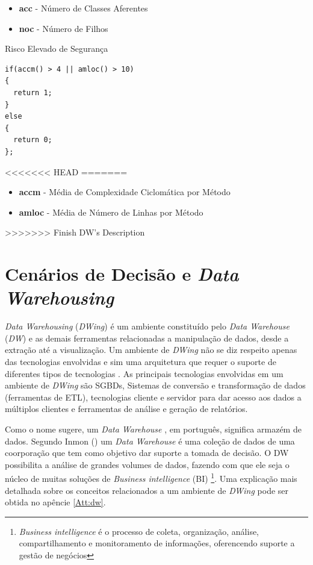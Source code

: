 \begin{itemize}
	\item \textbf{acc} - Número de Classes Aferentes
	\item \textbf{noc} - Número de Filhos
\end{itemize}

\begin{description}
	\item[Risco Elevado de Segurança]
\end{description}

\begin{lstlisting}[caption={\emph{Script} do Cenário \emph{High Risk Security}}, label=cpf]
if(accm() > 4 || amloc() > 10)
{
  return 1;
}
else
{
  return 0;
};
\end{lstlisting}

<<<<<<< HEAD
=======
\begin{itemize}
	\item \textbf{accm} - Média de Complexidade Ciclomática por Método
	\item \textbf{amloc} - Média de Número de Linhas por Método
\end{itemize}

>>>>>>> Finish DW's Description
\section{Cenários de Decisão e \emph{Data Warehousing}}
\label{dw-cenarios}

\emph{Data Warehousing} (\emph{DWing}) é um ambiente constituído pelo \emph{Data Warehouse} (\emph{DW}) e as demais ferramentas relacionadas a manipulação de dados, desde a extração até a visualização. Um ambiente de \emph{DWing} não se diz respeito apenas das tecnologias envolvidas e sim uma arquitetura que requer o suporte de diferentes tipos de tecnologias \cite{inmon2002}.  As principais tecnologias envolvidas em um ambiente de \emph{DWing} são SGBDs, Sistemas de conversão e transformação de dados (ferramentas de ETL), tecnologias cliente e servidor para dar acesso aos dados a múltiplos clientes e ferramentas de análise e geração de relatórios.

Como o nome sugere, um \emph{Data Warehouse} , em português, significa armazém de dados. Segundo Inmon (\citeyear{inmon2002}) um \emph{Data Warehouse} é uma coleção de dados de uma coorporação que tem como objetivo dar suporte a tomada de decisão. 
%
O DW possibilita a análise de grandes volumes de dados, fazendo com que ele seja o núcleo de muitas soluções de \emph{Business intelligence} (BI)
%
\footnote{\emph{Business intelligence} é o processo de coleta, organização, análise, compartilhamento e monitoramento de informações, oferencendo suporte a gestão de negócios}. 
%
Uma explicação mais detalhada sobre os  conceitos relacionados a um ambiente de \emph{DWing} pode ser obtida no  apêncie \ref{Att:dw}.

